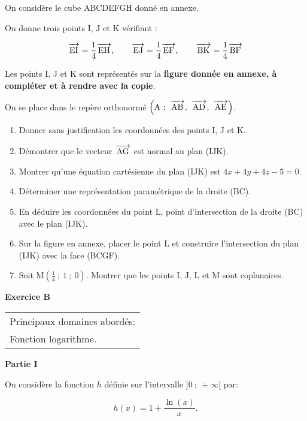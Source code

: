 \documentclass[11pt]{article}
\newcommand{\vect}[1]{\overrightarrow{\,\mathstrut#1\,}}
\begin{document}
\bigskip

On considère le cube ABCDEFGH donné en annexe. 

On donne trois points I, J et K vérifiant :

\[\vect{\text{EI}} = \dfrac{1}{4} \vect{\text{EH}},\qquad   \vect{\text{EJ}} = \dfrac{1}{4}  \vect{\text{EF}}, \qquad  \vect{\text{BK}} = \dfrac{1}{4}  \vect{\text{BF}}\]

Les points I, J et K sont représentés sur la \textbf{figure donnée en annexe, à compléter et à rendre avec la copie}.

On se place dans le repère orthonormé $\left(\text{A}~;~\vect{\text{AB}},~\vect{\text{AD}},~\vect{\text{AE}}\right)$.

\medskip

\begin{enumerate}
\item Donner sans justification les coordonnées des points I, J et K.
\item Démontrer que le vecteur $\vect{\text{AG}}$ est normal au plan (IJK).
\item Montrer qu'une équation cartésienne du plan (IJK) est $4x + 4y + 4z - 5 = 0$.
\item Déterminer une représentation paramétrique de la droite (BC).
\item En déduire les coordonnées du point L, point d'intersection de la droite (BC) avec le plan (IJK).
\item Sur la figure en annexe, placer le point L et construire l'intersection du plan (IJK) avec la face (BCGF).
\item Soit M$\left(\frac{1}{4}~;~1~;~0\right)$. Montrer que les points I, J, L et M sont coplanaires.
\end{enumerate}

\bigskip

\textbf{Exercice B}

\medskip

\begin{tabular}{|l|}\hline
Principaux domaines abordés:\\
Fonction logarithme.\\ \hline
\end{tabular}

\bigskip

\textbf{Partie I}

\medskip

On considère la fonction $h$ définie sur l'intervalle $]0~;~ +\infty[$ par:

\[h(x) = 1 + \dfrac{\ln (x)}{x}.\]
\end{document}
